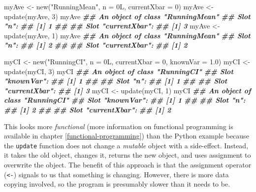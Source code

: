 \documentclass[
  12pt,
  krantz2]{krantz}
\makeatletter
\newenvironment{Shaded}{\begin{snugshade}}{\end{snugshade}}
\newcommand{\AttributeTok}[1]{\textcolor[rgb]{0.61,0.61,0.61}{#1}}
\newcommand{\DecValTok}[1]{\textcolor[rgb]{0.06,0.06,0.06}{#1}}
\newcommand{\DocumentationTok}[1]{\textcolor[rgb]{0.37,0.37,0.37}{\textbf{\textit{#1}}}}
\newcommand{\FloatTok}[1]{\textcolor[rgb]{0.06,0.06,0.06}{#1}}
\newcommand{\FunctionTok}[1]{\textcolor[rgb]{0,0,0}{#1}}
\newcommand{\NormalTok}[1]{#1}
\newcommand{\OtherTok}[1]{\textcolor[rgb]{0.37,0.37,0.37}{#1}}
\newcommand{\StringTok}[1]{\textcolor[rgb]{0.5,0.5,0.5}{#1}}
\newenvironment{kframe}{%
\medskip{}
\setlength{\fboxsep}{.8em}
 \def\at@end@of@kframe{}%
 \ifinner\ifhmode%
  \def\at@end@of@kframe{\end{minipage}}%
  \begin{minipage}{\columnwidth}%
 \fi\fi%
 \def\FrameCommand##1{\hskip\@totalleftmargin \hskip-\fboxsep
 \colorbox{shadecolor}{##1}\hskip-\fboxsep
     \hskip-\linewidth \hskip-\@totalleftmargin \hskip\columnwidth}%
 \MakeFramed {\advance\hsize-\width
   \@totalleftmargin\z@ \linewidth\hsize
   \@setminipage}}%
 {\par\unskip\endMakeFramed%
 \at@end@of@kframe}
\renewenvironment{Shaded}{\begin{kframe}}{\end{kframe}}
\makeatother
\begin{document}
\begin{Shaded}
\begin{Highlighting}[]
\NormalTok{myAve }\OtherTok{\textless{}{-}} \FunctionTok{new}\NormalTok{(}\StringTok{"RunningMean"}\NormalTok{, }\AttributeTok{n =}\NormalTok{ 0L, }\AttributeTok{currentXbar =} \DecValTok{0}\NormalTok{)}
\NormalTok{myAve }\OtherTok{\textless{}{-}} \FunctionTok{update}\NormalTok{(myAve, }\DecValTok{3}\NormalTok{)}
\NormalTok{myAve}
\DocumentationTok{\#\# An object of class "RunningMean"}
\DocumentationTok{\#\# Slot "n":}
\DocumentationTok{\#\# [1] 1}
\DocumentationTok{\#\# }
\DocumentationTok{\#\# Slot "currentXbar":}
\DocumentationTok{\#\# [1] 3}
\NormalTok{myAve }\OtherTok{\textless{}{-}} \FunctionTok{update}\NormalTok{(myAve, }\DecValTok{1}\NormalTok{)}
\NormalTok{myAve}
\DocumentationTok{\#\# An object of class "RunningMean"}
\DocumentationTok{\#\# Slot "n":}
\DocumentationTok{\#\# [1] 2}
\DocumentationTok{\#\# }
\DocumentationTok{\#\# Slot "currentXbar":}
\DocumentationTok{\#\# [1] 2}

\NormalTok{myCI }\OtherTok{\textless{}{-}} \FunctionTok{new}\NormalTok{(}\StringTok{"RunningCI"}\NormalTok{, }\AttributeTok{n =}\NormalTok{ 0L, }\AttributeTok{currentXbar =} \DecValTok{0}\NormalTok{, }\AttributeTok{knownVar =} \FloatTok{1.0}\NormalTok{)}
\NormalTok{myCI }\OtherTok{\textless{}{-}} \FunctionTok{update}\NormalTok{(myCI, }\DecValTok{3}\NormalTok{)}
\NormalTok{myCI}
\DocumentationTok{\#\# An object of class "RunningCI"}
\DocumentationTok{\#\# Slot "knownVar":}
\DocumentationTok{\#\# [1] 1}
\DocumentationTok{\#\# }
\DocumentationTok{\#\# Slot "n":}
\DocumentationTok{\#\# [1] 1}
\DocumentationTok{\#\# }
\DocumentationTok{\#\# Slot "currentXbar":}
\DocumentationTok{\#\# [1] 3}
\NormalTok{myCI }\OtherTok{\textless{}{-}} \FunctionTok{update}\NormalTok{(myCI, }\DecValTok{1}\NormalTok{)}
\NormalTok{myCI}
\DocumentationTok{\#\# An object of class "RunningCI"}
\DocumentationTok{\#\# Slot "knownVar":}
\DocumentationTok{\#\# [1] 1}
\DocumentationTok{\#\# }
\DocumentationTok{\#\# Slot "n":}
\DocumentationTok{\#\# [1] 2}
\DocumentationTok{\#\# }
\DocumentationTok{\#\# Slot "currentXbar":}
\DocumentationTok{\#\# [1] 2}
\end{Highlighting}
\end{Shaded}

This looks more \emph{functional} (more information on functional programming is available in chapter \ref{functional-programming}) than the Python example because the \texttt{update} function does not change a \emph{mutable} object with a side-effect. Instead, it takes the old object, changes it, returns the new object, and uses assignment to overwrite the object. The benefit of this approach is that the assignment operator (\texttt{\textless{}-}) signals to us that something is changing. However, there is more data copying involved, so the program is presumably slower than it needs to be.
\end{document}
